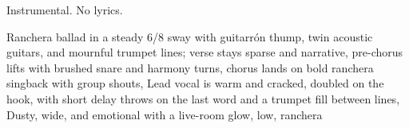 
\begin{notes}
Instrumental. No lyrics.
\end{notes}
\begin{prompt}
Ranchera ballad in a steady 6/8 sway with guitarrón thump, twin acoustic guitars, and mournful trumpet lines; verse stays sparse and narrative, pre-chorus lifts with brushed snare and harmony turns, chorus lands on bold ranchera singback with group shouts, Lead vocal is warm and cracked, doubled on the hook, with short delay throws on the last word and a trumpet fill between lines, Dusty, wide, and emotional with a live-room glow, low, ranchera
\end{prompt}

